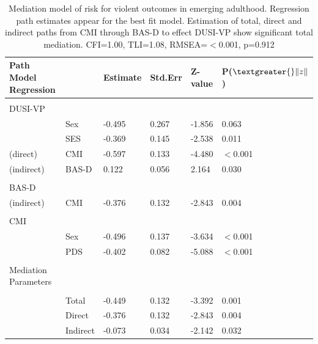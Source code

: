 \documentclass[utf8]{stylesheet}
\begin{document}
\begin{table}[h!]
\begin{tabular}{llllll}
Path Model Regression & & Estimate & Std.Err & Z-value & P($\textgreater{}\|z\|$) \\ \hline \\
DUSI-VP & & & & \\
& Sex  & -0.495    & 0.267   & -1.856   & 0.063 \\
& SES  & -0.369    & 0.145   & -2.538   & 0.011 \\
(direct) & CMI & -0.597    & 0.133   & -4.480   & $<$0.001 \\
(indirect) & BAS-D & 0.122    & 0.056   & 2.164   & 0.030 \\ \\
BAS-D & & & & \\
(indirect) & CMI  & -0.376    & 0.132   & -2.843   & 0.004 \\ \\
CMI & & & & \\
& Sex & -0.496    & 0.137   & -3.634   & $<$0.001 \\
& PDS  & -0.402    & 0.082   & -5.088   & $<$0.001 \\ \\
Mediation Parameters & & & & \\ \hline \\
& Total  & -0.449    & 0.132   & -3.392   & 0.001 \\
& Direct  & -0.376    & 0.132   & -2.843   & 0.004 \\
& Indirect  & -0.073    & 0.034   & -2.142   & 0.032 \\
\end{tabular}
\caption{Mediation model of risk for violent outcomes in emerging adulthood. Regression path estimates appear for the best fit model. Estimation of total, direct and indirect paths from CMI through BAS-D to effect DUSI-VP show significant total mediation. CFI=1.00, TLI=1.08, RMSEA=$<$0.001, p=0.912\label{tab:5}}
\end{table}
%
\clearpage

%

%
%
\end{document}
